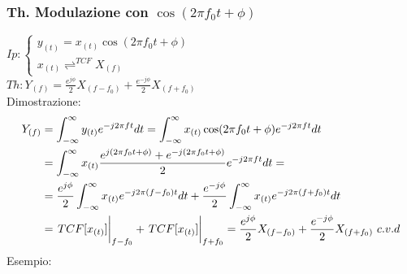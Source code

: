        \subsubsection{Th. Modulazione con $\cos(2\pi f_0t + \phi)$}\label{Modulazione con coseno generico}
            $Ip: \begin{cases}
                y_{(t)}= x_{(t)}\cos(2\pi f_0t + \phi)\\        
                x_{(t)}\rightleftharpoons^{TCF} X_{(f)}
                \end{cases}$\\
            $Th: Y_{(f)} = \frac{e^{j\phi}}{2} X_{(f-f_0)} + \frac{e^{-j\phi}}{2} X_{(f+f_0)} $ \\
            Dimostrazione: 
            \begin{align}
                Y_{(f)} & = \int_{-\infty}^{\infty} y_{(t)} e^{-j2\pi ft} dt = \int_{-\infty}^{\infty} x_{(t)}\cos(2\pi f_0t + \phi) e^{-j2\pi ft} dt \nonumber \\
                & =\int_{-\infty}^{\infty} x_{(t)} \frac{e^{j(2\pi f_0t+ \phi)} + e^{-j(2\pi f_0t+ \phi)}}{2} e^{-j2\pi ft} dt =  \nonumber \\
                & = \frac{e^{j\phi}}{2} \int_{-\infty}^{\infty} x_{(t)} e^{-j2\pi (f-f_0)t} dt + \frac{e^{-j\phi}}{2} \int_{-\infty}^{\infty} x_{(t)} e^{-j2\pi (f+f_0)t} dt \nonumber \\
                & = \eval{TCF[x_{(t)}]}_{f-f_0} + \eval{TCF[x_{(t)}]}_{f+f_0} = \frac{e^{j\phi}}{2} X_{(f-f_0)} + \frac{e^{-j\phi}}{2} X_{(f+f_0)}\ c.v.d \nonumber  
            \end{align}
            Esempio:
